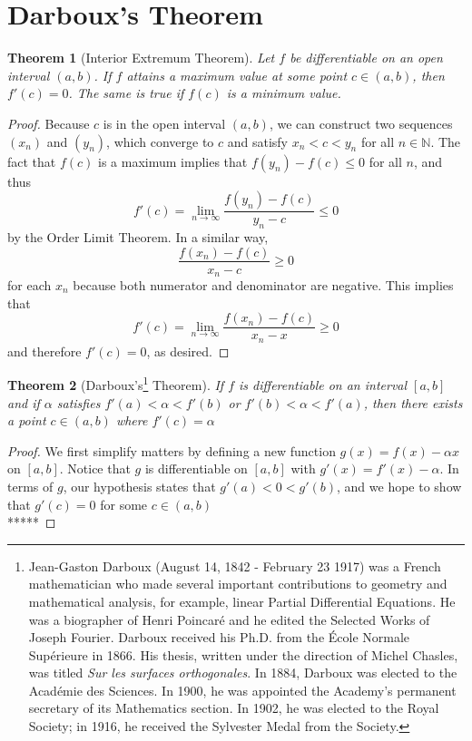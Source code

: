 \documentclass[10pt]{report}
\newtheorem{thm2}{Theorem}[section]
\begin{document}
\section{Darboux's Theorem}
\begin{thm2}[Interior Extremum Theorem]
Let $f$ be differentiable on an open interval $(a,b)$. If $f$ attains a maximum value at some point $c\in (a,b)$, then $f'(c) = 0$. The same is true if $f(c)$ is a minimum value.
\end{thm2}
\begin{proof}
Because $c$ is in the open interval $(a,b)$, we can construct two sequences $(x_n)$ and $(y_n)$, which converge to $c$ and satisfy $x_n<c<y_n$ for all $n\in\mathbb{N}$. The fact that $f(c)$ is a maximum implies that $f(y_n)-f(c)\leq 0$ for all $n$, and thus
$$f'(c) = \lim_{n\to\infty}\frac{f(y_n) - f(c)}{y_n - c}\leq 0$$ 
by the Order Limit Theorem. In a similar way, 
$$\frac{f(x_n)-f(c)}{x_n-c}\geq 0$$
for each $x_n$ because both numerator and denominator are negative. This implies that
$$f'(c) = \lim_{n\to\infty}\frac{f(x_n)-f(c)}{x_n-x}\geq 0$$
and therefore $f'(c)=0$, as desired.
\end{proof}
\begin{thm2}[Darboux's\footnote{Jean-Gaston Darboux (August 14, 1842 - February 23 1917) was a French mathematician who made several important contributions to geometry and mathematical analysis, for example, linear Partial Differential Equations. He was a biographer of Henri Poincar\'{e} and he edited the Selected Works of Joseph Fourier. Darboux received his Ph.D. from the \'{E}cole Normale Sup\'{e}rieure in 1866. His thesis, written under the direction of Michel Chasles, was titled \textit{Sur les surfaces orthogonales}. In 1884, Darboux was elected to the Acad\'{e}mie des Sciences. In 1900, he was appointed the Academy's permanent secretary of its Mathematics section. In 1902, he was elected to the Royal Society; in 1916, he received the Sylvester Medal from the Society.} Theorem]
If $f$ is differentiable on an interval $[a,b]$ and if $\alpha$ satisfies $f'(a)<\alpha< f'(b)$ or $f'(b)<\alpha< f'(a)$, then there exists a point $c\in (a,b)$ where $f'(c)=\alpha$
\end{thm2}
\begin{proof}
We first simplify matters by defining a new function $g(x) = f(x)-\alpha x$ on $[a,b]$. Notice that $g$ is differentiable on $[a,b]$ with $g'(x) = f'(x)-\alpha$. In terms of $g$, our hypothesis states that $g'(a) < 0 < g'(b)$, and we hope to show that $g'(c) = 0$ for some $c\in(a,b)$\\
*****
\end{proof}
\end{document}
